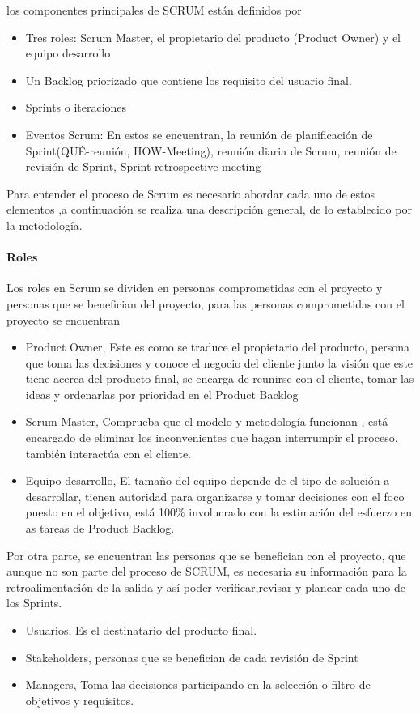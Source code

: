 los componentes principales de SCRUM están definidos por 
\begin{itemize}
    \item Tres roles: Scrum Master, el propietario del producto (Product Owner) y el equipo desarrollo
    \item Un Backlog priorizado que contiene los requisito del usuario final.
    \item Sprints o iteraciones
    \item Eventos Scrum: En estos se encuentran, la reunión de planificación de Sprint(QUÉ-reunión, HOW-Meeting), reunión diaria de Scrum, reunión de revisión de Sprint, Sprint retrospective meeting 
\end{itemize}

Para entender el proceso de Scrum es necesario abordar cada uno de estos elementos ,a continuación se realiza una descripción general, de lo establecido por la metodología. 

\paragraph{Roles}
Los roles en Scrum se dividen en personas comprometidas con el proyecto y personas que se benefician del proyecto, para las personas comprometidas con el proyecto se encuentran
\begin{itemize}
    \item Product Owner, Este es como se traduce el propietario del producto, persona que toma las decisiones y conoce el negocio del cliente junto la visión que este tiene acerca del producto final, se encarga de reunirse con el cliente, tomar las ideas y ordenarlas por prioridad en el Product Backlog
     \item Scrum Master, Comprueba que el modelo y metodología funcionan , está encargado de eliminar los inconvenientes que hagan interrumpir el proceso, también interactúa con el cliente.
     \item Equipo desarrollo, El tamaño del equipo depende de el tipo de solución a desarrollar, tienen autoridad para organizarse y tomar decisiones con el foco puesto en el objetivo, está 100\% involucrado con la estimación del esfuerzo en as tareas de Product Backlog.
\end{itemize}

Por otra parte, se encuentran las personas que se benefician con el proyecto, que aunque no son parte del proceso de SCRUM, es necesaria su información para la retroalimentación de la salida y así poder verificar,revisar y planear cada uno de los Sprints.
\begin{itemize}
    \item Usuarios, Es el destinatario del producto final. 
    \item Stakeholders, personas que se benefician de cada revisión de Sprint
    \item Managers, Toma las decisiones participando en la selección o filtro de objetivos y requisitos. 
\end{itemize}

